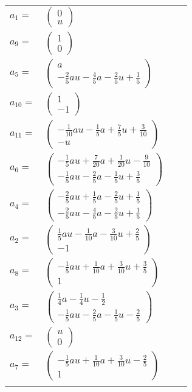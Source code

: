 \documentclass[1p]{elsarticle_modified}
\theoremstyle{definition}
\begin{document}
\begin{tabular}{m{7pt} m{180pt} m{7pt} m{180pt} }
\flushright $a_{1}=$&$\begin{pmatrix}0\\u\end{pmatrix}$ \\
\flushright $a_{9}=$&$\begin{pmatrix}1\\0\end{pmatrix}$ \\
\flushright $a_{5}=$&$\begin{pmatrix}a\\-\frac{2}{5} a u-\frac{4}{5} a-\frac{2}{5} u+\frac{1}{5}\end{pmatrix}$ \\
\flushright $a_{10}=$&$\begin{pmatrix}1\\-1\end{pmatrix}$ \\
\flushright $a_{11}=$&$\begin{pmatrix}-\frac{1}{10} a u-\frac{1}{5} a+\frac{7}{5} u+\frac{3}{10}\\- u\end{pmatrix}$ \\
\flushright $a_{6}=$&$\begin{pmatrix}-\frac{1}{5} a u+\frac{7}{20} a+\frac{1}{20} u-\frac{9}{10}\\-\frac{1}{5} a u-\frac{2}{5} a-\frac{1}{5} u+\frac{3}{5}\end{pmatrix}$ \\
\flushright $a_{4}=$&$\begin{pmatrix}-\frac{2}{5} a u+\frac{1}{5} a-\frac{2}{5} u+\frac{1}{5}\\-\frac{2}{5} a u-\frac{4}{5} a-\frac{2}{5} u+\frac{1}{5}\end{pmatrix}$ \\
\flushright $a_{2}=$&$\begin{pmatrix}\frac{1}{5} a u-\frac{1}{10} a-\frac{3}{10} u+\frac{2}{5}\\-1\end{pmatrix}$ \\
\flushright $a_{8}=$&$\begin{pmatrix}-\frac{1}{5} a u+\frac{1}{10} a+\frac{3}{10} u+\frac{3}{5}\\1\end{pmatrix}$ \\
\flushright $a_{3}=$&$\begin{pmatrix}\frac{1}{4} a-\frac{1}{4} u-\frac{1}{2}\\-\frac{1}{5} a u-\frac{2}{5} a-\frac{1}{5} u-\frac{2}{5}\end{pmatrix}$ \\
\flushright $a_{12}=$&$\begin{pmatrix}u\\0\end{pmatrix}$ \\
\flushright $a_{7}=$&$\begin{pmatrix}-\frac{1}{5} a u+\frac{1}{10} a+\frac{3}{10} u-\frac{2}{5}\\1\end{pmatrix}$\\&\end{tabular}
\end{document}
